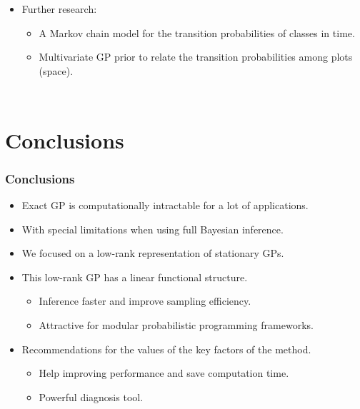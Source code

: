 \documentclass[8pt]{beamer} %
\begin{document}
\begin{frame}[t]
\begin{columns}
\begin{itemize}
 
\item[] Further research:

\begin{itemize}\setlength\itemsep{1mm}
\item A Markov chain model for the transition probabilities of classes in time.

\item Multivariate GP prior to relate the transition probabilities among plots (space).
\end{itemize}
\end{itemize}
\end{columns}
\end{frame}


\section{Conclusions}
\begin{frame}\frametitle{\normalsize Conclusions}

\begin{itemize}\setlength\itemsep{2mm}
\item Exact GP is computationally intractable for a lot of applications.

\item With special limitations when using full Bayesian inference.

\item We focused on a low-rank representation of stationary GPs.%

\item This low-rank GP has a linear functional structure.

\begin{itemize}\setlength\itemsep{1mm}
\item Inference faster and improve sampling efficiency.

\item Attractive for modular probabilistic programming frameworks.
\end{itemize}

\item Recommendations for the values of the key factors of the method.\\[1mm]

\begin{itemize}\setlength\itemsep{1mm}
\item Help improving performance and save computation time.
\item Powerful diagnosis tool.
\end{itemize}

\end{itemize}
\end{frame}
\end{document}
